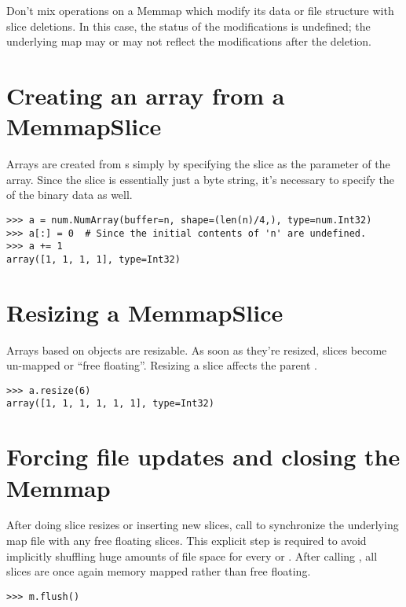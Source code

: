 Don't mix operations on a Memmap which modify its data or file
structure with slice deletions.  In this case, the status of the
modifications is undefined; the underlying map may or may not reflect
the modifications after the deletion.

\section{Creating an array from a MemmapSlice}
\label{sec:memmap-array-construction}

Arrays are created from s simply by specifying the
slice as the  parameter of the array.  Since the slice is
essentially just a byte string, it's necessary to specify the
 of the binary data as well.

\begin{verbatim}
>>> a = num.NumArray(buffer=n, shape=(len(n)/4,), type=num.Int32)
>>> a[:] = 0  # Since the initial contents of 'n' are undefined.
>>> a += 1
array([1, 1, 1, 1], type=Int32)
\end{verbatim}

\section{Resizing a MemmapSlice}
\label{sec:memmap-slice}

Arrays based on  objects are resizable.  As soon as
they're resized, slices become un-mapped or ``free floating''.
Resizing a slice affects the parent .

\begin{verbatim}
>>> a.resize(6)
array([1, 1, 1, 1, 1, 1], type=Int32)
\end{verbatim}

\section{Forcing file updates and closing the Memmap}
\label{sec:memmap-flushing-closing}

After doing slice resizes or inserting new slices, call
 to synchronize the underlying map file with any free
floating slices.  This explicit step is required to avoid implicitly
shuffling huge amounts of file space for every  or
.  After calling , all slices are
once again memory mapped rather than free floating.

\begin{verbatim}
>>> m.flush()
\end{verbatim}

